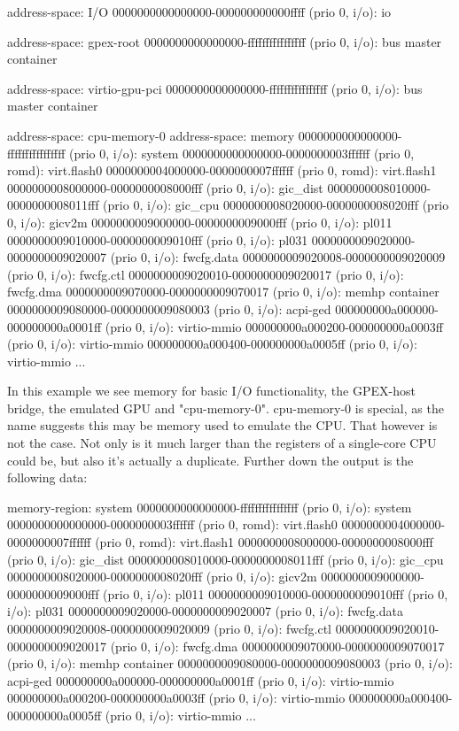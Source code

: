 \begin{ffcode}
    address-space: I/O
    0000000000000000-000000000000ffff (prio 0, i/o): io

  address-space: gpex-root
    0000000000000000-ffffffffffffffff (prio 0, i/o): bus master container

  address-space: virtio-gpu-pci
    0000000000000000-ffffffffffffffff (prio 0, i/o): bus master container

  address-space: cpu-memory-0
  address-space: memory
    0000000000000000-ffffffffffffffff (prio 0, i/o): system
      0000000000000000-0000000003ffffff (prio 0, romd): virt.flash0
      0000000004000000-0000000007ffffff (prio 0, romd): virt.flash1
      0000000008000000-0000000008000fff (prio 0, i/o): gic_dist
      0000000008010000-0000000008011fff (prio 0, i/o): gic_cpu
      0000000008020000-0000000008020fff (prio 0, i/o): gicv2m
      0000000009000000-0000000009000fff (prio 0, i/o): pl011
      0000000009010000-0000000009010fff (prio 0, i/o): pl031
      0000000009020000-0000000009020007 (prio 0, i/o): fwcfg.data
      0000000009020008-0000000009020009 (prio 0, i/o): fwcfg.ctl
      0000000009020010-0000000009020017 (prio 0, i/o): fwcfg.dma
      0000000009070000-0000000009070017 (prio 0, i/o): memhp container
      0000000009080000-0000000009080003 (prio 0, i/o): acpi-ged
      000000000a000000-000000000a0001ff (prio 0, i/o): virtio-mmio
      000000000a000200-000000000a0003ff (prio 0, i/o): virtio-mmio
      000000000a000400-000000000a0005ff (prio 0, i/o): virtio-mmio
      ...
\end{ffcode}

In this example we see memory for basic I/O functionality, the GPEX-host bridge, the emulated GPU and "cpu-memory-0".
cpu-memory-0 is special, as the name suggests this may be memory used to emulate the CPU. That however is not the case.
Not only is it much larger than the registers of a single-core CPU could be, but also it's actually a duplicate.
Further down the output is the following data:

\begin{ffcode}
    memory-region: system
    0000000000000000-ffffffffffffffff (prio 0, i/o): system
      0000000000000000-0000000003ffffff (prio 0, romd): virt.flash0
      0000000004000000-0000000007ffffff (prio 0, romd): virt.flash1
      0000000008000000-0000000008000fff (prio 0, i/o): gic_dist
      0000000008010000-0000000008011fff (prio 0, i/o): gic_cpu
      0000000008020000-0000000008020fff (prio 0, i/o): gicv2m
      0000000009000000-0000000009000fff (prio 0, i/o): pl011
      0000000009010000-0000000009010fff (prio 0, i/o): pl031
      0000000009020000-0000000009020007 (prio 0, i/o): fwcfg.data
      0000000009020008-0000000009020009 (prio 0, i/o): fwcfg.ctl
      0000000009020010-0000000009020017 (prio 0, i/o): fwcfg.dma
      0000000009070000-0000000009070017 (prio 0, i/o): memhp container
      0000000009080000-0000000009080003 (prio 0, i/o): acpi-ged
      000000000a000000-000000000a0001ff (prio 0, i/o): virtio-mmio
      000000000a000200-000000000a0003ff (prio 0, i/o): virtio-mmio
      000000000a000400-000000000a0005ff (prio 0, i/o): virtio-mmio
      ...
\end{ffcode}

